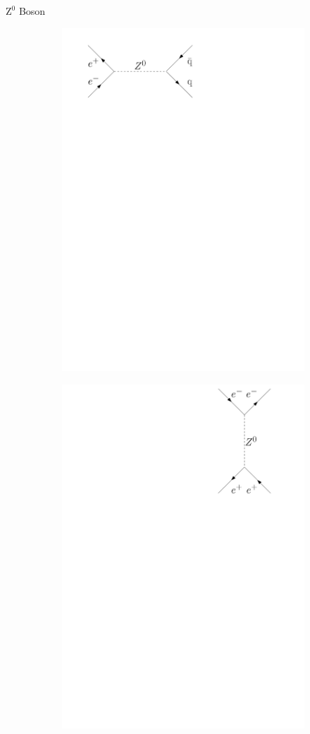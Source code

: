 \documentclass[11pt,xcolor=dvipsnames,professionalfonts]{beamer}
\begin{document}
\begin{frame}{$\mathrm{Z}^0$ Boson}
\begin{figure}[htb]
\begin{subfigure}{.28\textwidth}
			\includegraphics[width=.8\textwidth]{./figures/theory/feynman/qq}
		\end{subfigure}
		\begin{subfigure}{.28\textwidth}
			\centering
			\includegraphics[width=.8\textwidth]{./figures/theory/feynman/ee_t}
		\end{subfigure}
	\end{figure}
\end{frame}
\end{document}
